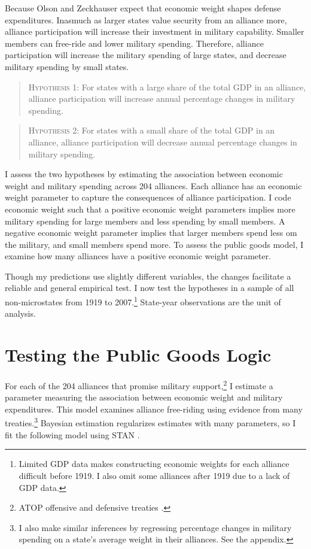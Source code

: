 \documentclass[12pt]{article}
\begin{document}
Because Olson and Zeckhauser expect that economic weight shapes defense expenditures. 
Inasmuch as larger states value security from an alliance more, alliance participation will increase their investment in military capability.
Smaller members can free-ride and lower military spending. 
Therefore, alliance participation will increase the military spending of large states, and decrease military spending by small states. 


\begin{quote}
\textsc{Hypothesis 1}: For states with a large share of the total GDP in an alliance, alliance participation will increase annual percentage changes in military spending. 
\end{quote}


\begin{quote}
\textsc{Hypothesis 2}: For states with a small share of the total GDP in an alliance, alliance participation will decrease annual percentage changes in military spending.
\end{quote}


I assess the two hypotheses by estimating the association between economic weight and military spending across 204 alliances. 
Each alliance has an economic weight parameter to capture the consequences of alliance participation. 
I code economic weight such that a positive economic weight parameters implies more military spending for large members and less spending by small members. 
A negative economic weight parameter implies that larger members spend less om the military, and small members spend more. 
To assess the public goods model, I examine how many alliances have a positive economic weight parameter.  
 

Though my predictions use slightly different variables, the changes facilitate a reliable and general empirical test.
I now test the hypotheses in a sample of all non-microstates from 1919 to 2007.\footnote{Limited GDP data makes constructing economic weights for each alliance difficult before 1919. I also omit some alliances after 1919 due to a lack of GDP data.}
State-year observations are the unit of analysis.


\section{Testing the Public Goods Logic}


For each of the 204 alliances that promise military support,\footnote{ATOP offensive and defensive treaties \citep{Leedsetal2002}.} I estimate a parameter measuring the association between economic weight and military expenditures. 
This model examines alliance free-riding using evidence from many treaties.\footnote{I also make similar inferences by regressing percentage changes in military spending on a state's average weight in their alliances. See the appendix.}
Bayesian estimation regularizes estimates with many parameters, so I fit the following model using STAN \citep{Carpenteretal2016}.
\end{document}

